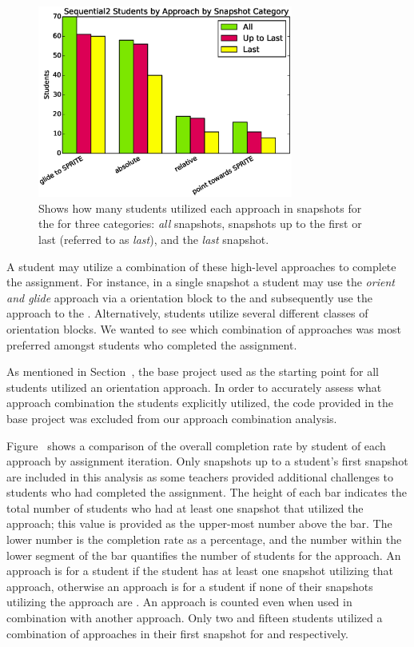 \begin{figure}[!t]
\centering \includegraphics[width=3.3in]{graphs/approach_bar_Sequential2.eps}
\caption{Shows how many students utilized each approach in snapshots for the
  \stwo{} for three categories: \emph{all} snapshots, snapshots up to the first
  \com{} or last \incom{} (referred to as \emph{last}), and the \emph{last}
  snapshot.}
\end{figure}

A student may utilize a combination of these high-level approaches to complete
the assignment. For instance, in a single snapshot a student may use the
\emph{orient and glide} approach via a \rel{} orientation block to \catch{} the
\bear{} and subsequently use the \glideto{} approach to \catch{} the
\horse{}. Alternatively, students utilize several different classes of
orientation blocks. We wanted to see which combination of approaches was most
preferred amongst students who completed the assignment.

As mentioned in Section~, the base project used as the
starting point for all students utilized an \abs{} orientation approach. In
order to accurately assess what approach combination the students explicitly
utilized, the code provided in the base project was excluded from our approach
combination analysis.

Figure~ shows a comparison of the
overall completion rate by student of each approach by assignment
iteration. Only snapshots up to a student's first \com{} snapshot are included
in this analysis as some teachers provided additional challenges to students
who had completed the assignment. The height of each bar indicates the total
number of students who had at least one snapshot that utilized the approach;
this value is provided as the upper-most number above the bar. The lower number
is the completion rate as a percentage, and the number within the lower segment
of the bar quantifies the number of \com{} students for the approach. An
approach is \com{} for a student if the student has at least one \com{}
snapshot utilizing that approach, otherwise an approach is \incom{} for a
student if none of their snapshots utilizing the approach are \com{}. An
approach is counted even when used in combination with another approach. Only
two and fifteen students utilized a combination of approaches in their first
\com{} snapshot for \sone{} and \stwo{} respectively.

